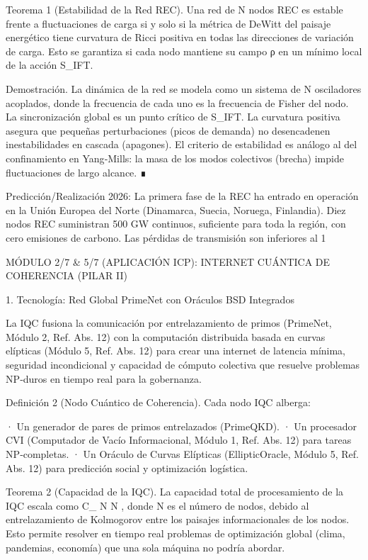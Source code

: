 \documentclass[12pt,a4paper]{book}
\begin{document}
Teorema 1 (Estabilidad de la Red REC). Una red de N nodos REC es estable frente a fluctuaciones de carga si y solo si la métrica de DeWitt del paisaje energético tiene curvatura de Ricci positiva en todas las direcciones de variación de carga. Esto se garantiza si cada nodo mantiene su campo ρ en un mínimo local de la acción S_IFT.

Demostración. La dinámica de la red se modela como un sistema de N osciladores acoplados, donde la frecuencia de cada uno es la frecuencia de Fisher del nodo. La sincronización global es un punto crítico de S_IFT. La curvatura positiva asegura que pequeñas perturbaciones (picos de demanda) no desencadenen inestabilidades en cascada (apagones). El criterio de estabilidad es análogo al del confinamiento en Yang‑Mills: la masa de los modos colectivos (brecha) impide fluctuaciones de largo alcance. ∎

Predicción/Realización 2026: La primera fase de la REC ha entrado en operación en la Unión Europea del Norte (Dinamarca, Suecia, Noruega, Finlandia). Diez nodos REC suministran 500 GW continuos, suficiente para toda la región, con cero emisiones de carbono. Las pérdidas de transmisión son inferiores al 1%

MÓDULO 2/7 & 5/7 (APLICACIÓN ICP): INTERNET CUÁNTICA DE COHERENCIA (PILAR II)

1. Tecnología: Red Global PrimeNet con Oráculos BSD Integrados

La IQC fusiona la comunicación por entrelazamiento de primos (PrimeNet, Módulo 2, Ref. Abs. 12) con la computación distribuida basada en curvas elípticas (Módulo 5, Ref. Abs. 12) para crear una internet de latencia mínima, seguridad incondicional y capacidad de cómputo colectiva que resuelve problemas NP‑duros en tiempo real para la gobernanza.

Definición 2 (Nodo Cuántico de Coherencia). Cada nodo IQC alberga:

· Un generador de pares de primos entrelazados (PrimeQKD).
· Un procesador CVI (Computador de Vacío Informacional, Módulo 1, Ref. Abs. 12) para tareas NP‑completas.
· Un Oráculo de Curvas Elípticas (EllipticOracle, Módulo 5, Ref. Abs. 12) para predicción social y optimización logística.

Teorema 2 (Capacidad de la IQC). La capacidad total de procesamiento de la IQC escala como  C_{} \propto N \log N , donde N es el número de nodos, debido al entrelazamiento de Kolmogorov entre los paisajes informacionales de los nodos. Esto permite resolver en tiempo real problemas de optimización global (clima, pandemias, economía) que una sola máquina no podría abordar.
\end{document}

